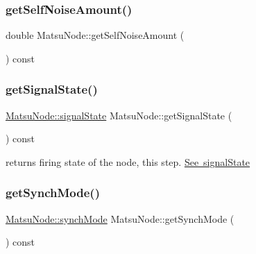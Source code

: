 \mbox{\label{classMatsuNode_a8af234bda8b179e1d3f7bb1a89377b43}} 
\subsubsection{\texorpdfstring{get\+Self\+Noise\+Amount()}{getSelfNoiseAmount()}}
{\footnotesize\ttfamily double Matsu\+Node\+::get\+Self\+Noise\+Amount (\begin{DoxyParamCaption}{ }\end{DoxyParamCaption}) const}

\mbox{\label{classMatsuNode_a43082483deea988ef12dfe8d945c3122}} 
\subsubsection{\texorpdfstring{get\+Signal\+State()}{getSignalState()}}
{\footnotesize\ttfamily \mbox{\hyperlink{classMatsuNode_abd587a4a72c6774f689d21c78a8bc239}{Matsu\+Node\+::signal\+State}} Matsu\+Node\+::get\+Signal\+State (\begin{DoxyParamCaption}{ }\end{DoxyParamCaption}) const}



returns firing state of the node, this step. \mbox{\hyperlink{classMatsuNode_abd587a4a72c6774f689d21c78a8bc239}{See signal\+State}} 

\mbox{\label{classMatsuNode_a1529b4c1b11490c66f023d7afe55fae7}} 
\subsubsection{\texorpdfstring{get\+Synch\+Mode()}{getSynchMode()}}
{\footnotesize\ttfamily \mbox{\hyperlink{classMatsuNode_a725e228db39b8842f851ddf88f640bed}{Matsu\+Node\+::synch\+Mode}} Matsu\+Node\+::get\+Synch\+Mode (\begin{DoxyParamCaption}{ }\end{DoxyParamCaption}) const}

